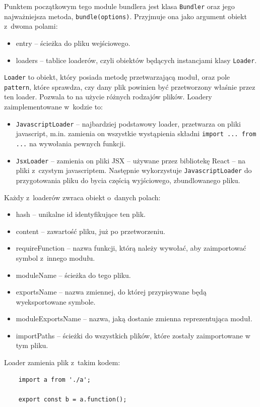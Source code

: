 \documentclass{SGGW-thesis}
\begin{document}
Punktem początkowym tego module bundlera jest klasa \verb|Bundler| oraz jego najważniejsza metoda, \verb|bundle(options)|. Przyjmuje ona jako argument obiekt z~dwoma polami: 
\begin{itemize}
    \item entry -- ścieżka do pliku wejściowego.
    \item loaders -- tablice loaderów, czyli obiektów będących instancjami klasy \verb|Loader|.
\end{itemize}

\verb|Loader| to obiekt, który posiada metodę przetwarzającą moduł, oraz pole \verb|pattern|, które sprawdza, czy dany plik powinien być przetworzony właśnie przez ten loader. Pozwala to na użycie różnych rodzajów plików. Loadery zaimplementowane w~kodzie to:
\begin{itemize}
    \item \verb|JavascriptLoader| -- najbardziej podstawowy loader, przetwarza on pliki javascript, m.in. zamienia on wszystkie wystąpienia składni \verb|import ... from ...| na wywołania pewnych funkcji.
    \item \verb|JsxLoader| -- zamienia on pliki JSX -- używane przez bibliotekę React -- na pliki z~czystym javascriptem. Następnie wykorzystuje \verb|JavascriptLoader| do przygotowania pliku do bycia częścią wyjściowego, zbundlowanego pliku.
\end{itemize}

Każdy z~loaderów zwraca obiekt o~danych polach:
\begin{itemize}
    \item hash -- unikalne id identyfikujące ten plik.
    \item content -- zawartość pliku, już po przetworzeniu.
    \item requireFunction -- nazwa funkcji, którą należy wywołać, aby zaimportować symbol z~innego modułu.
    \item moduleName -- ścieżka do tego pliku.
    \item exportsName -- nazwa zmiennej, do której przypisywane będą wyeksportowane symbole.
    \item moduleExportsName -- nazwa, jaką dostanie zmienna reprezentująca moduł.
    \item importPaths -- ścieżki do wszystkich plików, które zostały zaimportowane w tym pliku.
\end{itemize}

Loader zamienia plik z~takim kodem:
\begin{verbatim}
    import a from './a';

    export const b = a.function();
\end{verbatim}
\end{document}
